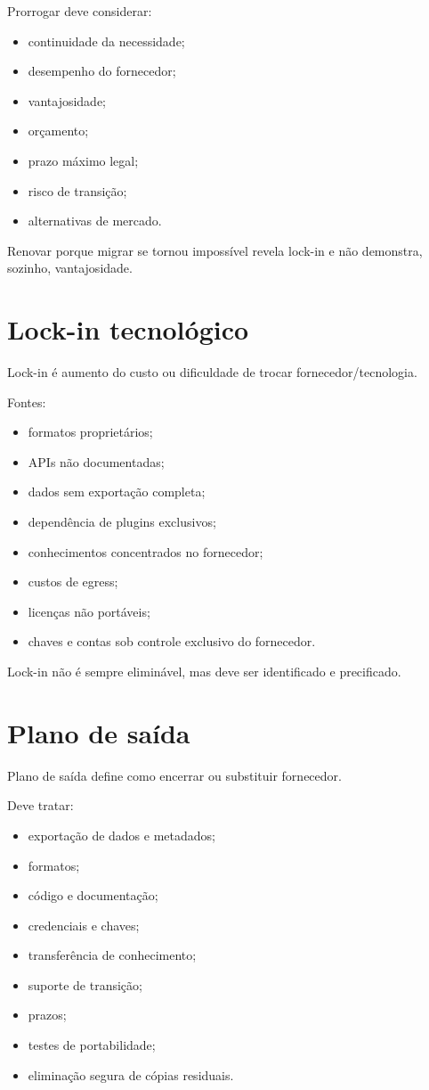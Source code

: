 Prorrogar deve considerar:
\begin{itemize}
\item continuidade da necessidade;
\item desempenho do fornecedor;
\item vantajosidade;
\item orçamento;
\item prazo máximo legal;
\item risco de transição;
\item alternativas de mercado.
\end{itemize}

Renovar porque migrar se tornou impossível revela lock-in e não demonstra, sozinho, vantajosidade.

\section{Lock-in tecnológico}

Lock-in é aumento do custo ou dificuldade de trocar fornecedor/tecnologia.

Fontes:
\begin{itemize}
\item formatos proprietários;
\item APIs não documentadas;
\item dados sem exportação completa;
\item dependência de plugins exclusivos;
\item conhecimentos concentrados no fornecedor;
\item custos de egress;
\item licenças não portáveis;
\item chaves e contas sob controle exclusivo do fornecedor.
\end{itemize}

Lock-in não é sempre eliminável, mas deve ser identificado e precificado.

\section{Plano de saída}

Plano de saída define como encerrar ou substituir fornecedor.

Deve tratar:
\begin{itemize}
\item exportação de dados e metadados;
\item formatos;
\item código e documentação;
\item credenciais e chaves;
\item transferência de conhecimento;
\item suporte de transição;
\item prazos;
\item testes de portabilidade;
\item eliminação segura de cópias residuais.
\end{itemize}

